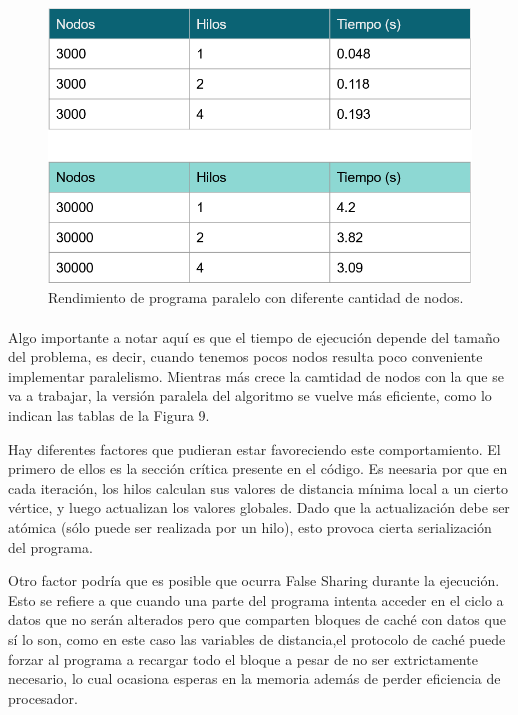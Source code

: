 \documentclass[11pt]{article}
\begin{document}
\begin{figure}
\centering
\includegraphics[width=0.9\linewidth]{tablas1.png}
  \caption{Rendimiento de programa paralelo con diferente cantidad de nodos.}
\end{figure}


\paragraph{}
Algo importante a notar aquí es que el tiempo de ejecución depende del tamaño del problema, es decir, cuando tenemos pocos nodos resulta poco conveniente implementar paralelismo. Mientras más crece la camtidad de nodos con la que se va a trabajar, la versión paralela del algoritmo se vuelve más eficiente, como lo indican las tablas de la Figura 9. 
\par 
Hay diferentes factores que pudieran estar favoreciendo este comportamiento. El primero de ellos es la sección crítica presente en el código. Es neesaria por que en cada iteración, los hilos calculan sus valores de distancia mínima local a un cierto vértice, y luego actualizan los valores globales. Dado que la actualización debe ser atómica (sólo puede ser realizada por un hilo), esto provoca cierta serialización del programa.
\par
Otro factor podría que es posible que ocurra False Sharing durante la ejecución. Esto se refiere a que cuando una parte del programa intenta acceder en el ciclo a datos que no serán alterados pero que comparten bloques de caché con datos que sí lo son, como en este caso las variables de distancia,el protocolo de caché puede forzar al programa a recargar todo el bloque a pesar de no ser extrictamente necesario, lo cual ocasiona esperas en la memoria además de perder eficiencia de procesador.
\end{document}
